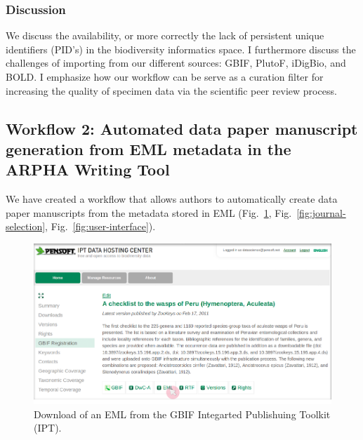\subsubsection{Discussion}

We discuss the availability, or more correctly the lack of persistent unique identifiers (PID's) in the biodiversity informatics space. I furthermore discuss the challenges of importing from our different sources: GBIF, PlutoF, iDigBio, and BOLD. I emphasize how our workflow can be serve as  a curation filter for increasing the quality of specimen data via the scientific peer review process. 

\subsection{Workflow 2: Automated data paper manuscript generation from EML metadata in the ARPHA Writing Tool}

We have created a workflow that allows authors to automatically create data paper manuscripts from the metadata stored in EML (Fig.~\ref{fig:EML-download}, Fig.~\ref{fig:journal-selection}, Fig.~\ref{fig:user-interface}).

\begin{figure}
\centering
\includegraphics[width=\textwidth]{Figures/EML-download}
\decoRule
\caption{Download of an EML from the GBIF Integarted Publishuing Toolkit (IPT).}
\label{fig:EML-download}
\end{figure}

